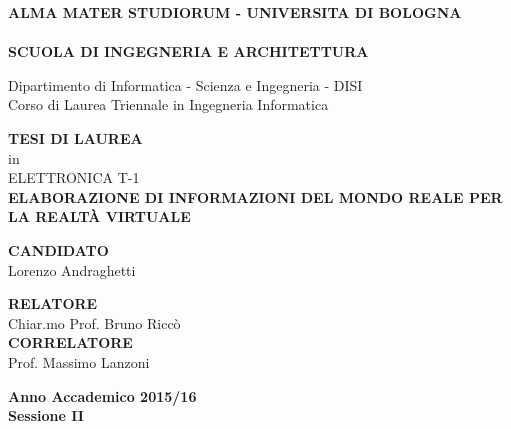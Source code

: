 \setlength{\textwidth}{450pt}
\vspace*{-2.5cm}
\begin{center}
  \textbf{ALMA MATER STUDIORUM - UNIVERSITA DI BOLOGNA}\\
  \vspace*{-.38cm}
  \hrulefill\\
  
  \textbf{SCUOLA DI INGEGNERIA  E ARCHITETTURA}\\
  \vspace*{.75cm}
  
  
  Dipartimento di Informatica - Scienza e Ingegneria - DISI\\
  Corso di Laurea Triennale in Ingegneria Informatica\\
  
  \vspace*{1.2cm}
  
  
  \textbf{TESI DI LAUREA}\\
  \vspace*{.4cm}
  in\\
  \vspace*{.4cm}
  ELETTRONICA T-1\\

  \vspace*{3.2cm} \Large
  \textbf{ELABORAZIONE DI INFORMAZIONI DEL MONDO REALE PER LA REALTÀ VIRTUALE}\\
 \end{center}
 
 \vspace*{3cm}
 
 \begin{flushleft}
  \textbf{CANDIDATO}\\ Lorenzo Andraghetti \\
\end{flushleft}

\vspace*{-2cm}

 \begin{flushright}
  \textbf{RELATORE}\\ Chiar.mo Prof. Bruno Riccò \\
  \vspace*{0.8cm}
  \textbf{CORRELATORE}\\ Prof. Massimo Lanzoni
 \end{flushright}

   
\vspace*{1.5cm}

\begin{center}
	\textbf{
  Anno Accademico 2015/16\\
  Sessione II
  }
\end{center}
\setlength{\textwidth}{380pt}
